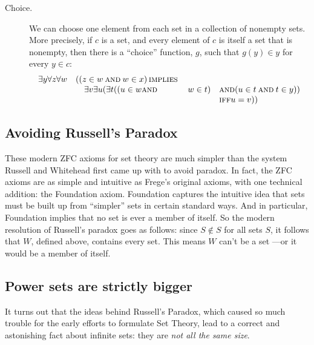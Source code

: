 \begin{description}
\iffalse  %
For every non-empty set, $x$, there is a set $y \in x$
  such that $x$ and $y$ have no elements in common.  
\fi

\item[Choice.]  We can choose one element from each set in a collection of
  nonempty sets.  More precisely, if $c$ is a set, and every element
  of $c$ is itself a set that is nonempty, then there is a ``choice''
  function, $g$, such that $g(y) \in y$ for every $y \in c$:
\[\begin{array}{rlll}
\exists y \forall z \forall w & ( (z \in w \mathbin{\mathrm{\textsc{and}}} w \in x) \mathbin{\mathrm{\textsc{\,implies\,}}}\\
                              &\quad \exists v \exists u (\exists t
                                           ((u \in w \mathbin{\mathrm{\textsc{and}}} & w \in t)
                                                              & \mathbin{\mathrm{\textsc{and}}} (u \in t \mathbin{\mathrm{\textsc{and}}} t \in y))\\
                                                            &&& \mathbin{\mathrm{\textsc{iff}}} u = v))
\end{array}\]

\end{description}


\subsection{Avoiding Russell's Paradox}

These modern ZFC axioms for set theory are much simpler than the system
Russell and Whitehead first came up with to avoid paradox.  In fact, the
ZFC axioms are as simple and intuitive as Frege's original axioms, with
one technical addition: the Foundation axiom.  Foundation captures the
intuitive idea that sets must be built up from ``simpler'' sets in certain
standard ways.  And in particular, Foundation implies that no set is ever
a member of itself.  So the modern resolution of Russell's paradox goes as
follows: since $S \not \in S$ for all sets $S$, it follows that $W$,
defined above, contains every set.  This means $W$ can't be a set ---or it
would be a member of itself.

\subsection{Power sets are strictly bigger}

It turns out that the ideas behind Russell's Paradox, which caused so much
trouble for the early efforts to formulate Set Theory, lead to a correct
and astonishing fact about infinite sets: they are \emph{not all the same
  size}.

